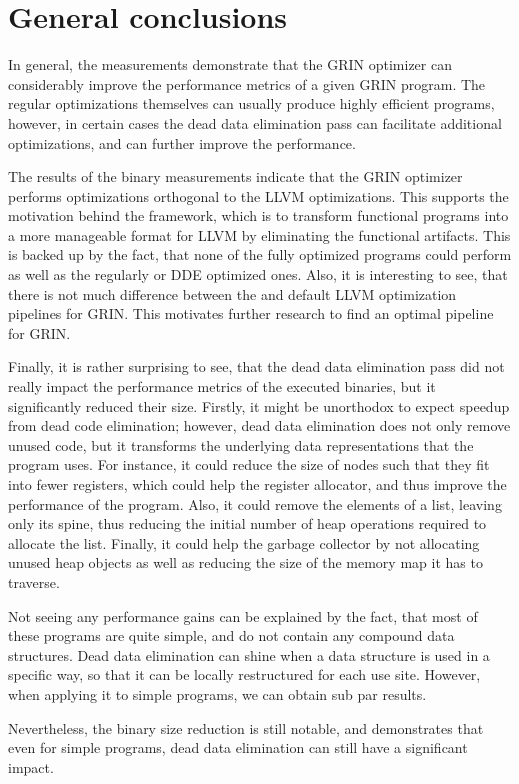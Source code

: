 \documentclass[main.tex]{subfiles}
\begin{document}
	\section{General conclusions}
	
	In general, the measurements demonstrate that the GRIN optimizer can considerably improve the performance metrics of a given GRIN program. The regular optimizations themselves can usually produce highly efficient programs, however, in certain cases the dead data elimination pass can facilitate additional optimizations, and can further improve the performance.
	
	The results of the binary measurements indicate that the GRIN optimizer performs optimizations orthogonal to the LLVM optimizations. This supports the motivation behind the framework, which is to transform functional programs into a more manageable format for LLVM by eliminating the functional artifacts. This is backed up by the fact, that none of the fully optimized  programs could perform as well as the regularly or DDE optimized ones. Also, it is interesting to see, that there is not much difference between the  and  default LLVM optimization pipelines for GRIN. This motivates further research to find an optimal pipeline for GRIN. 
	
	Finally, it is rather surprising to see, that the dead data elimination pass did not really impact the performance metrics of the executed binaries, but it significantly reduced their size. Firstly, it might be unorthodox to expect speedup from dead code elimination; however, dead data elimination does not only remove unused code, but it transforms the underlying data representations that the program uses. For instance, it could reduce the size of nodes such that they fit into fewer registers, which could help the register allocator, and thus improve the performance of the program. Also, it could remove the elements of a list, leaving only its spine, thus reducing the initial number of heap operations required to allocate the list. Finally, it could help the garbage collector by not allocating unused heap objects as well as reducing the size of the memory map it has to traverse.
	
	Not seeing any performance gains can be explained by the fact, that most of these programs are quite simple, and do not contain any compound data structures. Dead data elimination can shine when a data structure is used in a specific way, so that it can be locally restructured for each use site. However, when applying it to simple programs, we can obtain sub par results. 
	
	Nevertheless, the binary size reduction is still notable, and demonstrates that even for simple programs, dead data elimination can still have a significant impact.
\end{document}
